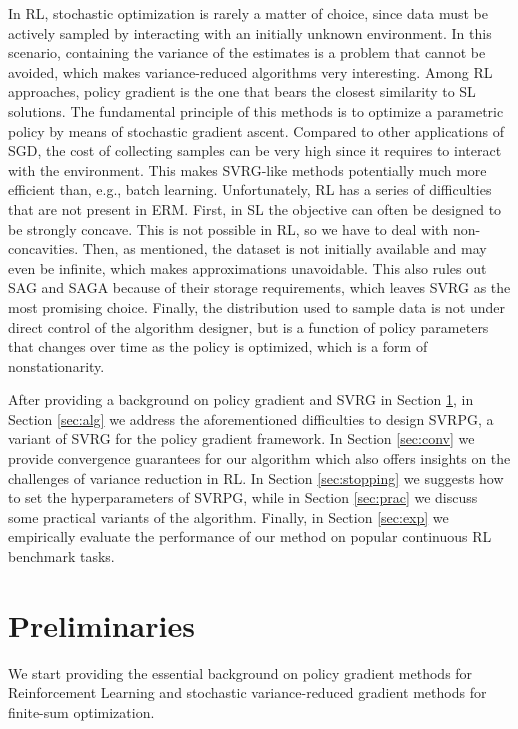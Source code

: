 \documentclass{article}
\makeatletter
\theoremstyle{remark}
\theoremstyle{definition}
\DeclareRobustCommand{\eg}{e.g.,\@\xspace}
\DeclareRobustCommand{\wrt}{w.r.t.\@\xspace}
\makeatother
\begin{document}
In RL, stochastic optimization is rarely a matter of choice, since data must be actively sampled by interacting with an initially unknown environment. In this scenario, containing the variance of the estimates is a problem that cannot be avoided, which makes variance-reduced algorithms very interesting.
Among RL approaches, policy gradient \cite{sutton2000policy} is the one that bears the closest similarity to SL solutions. The fundamental principle of this methods is to optimize a parametric policy by means of stochastic gradient ascent. Compared to other applications of SGD, the cost of collecting samples can be very high since it requires to interact with the environment. This makes SVRG-like methods potentially much more efficient than, \eg batch learning.
Unfortunately, RL has a series of difficulties that are not present in ERM. First, in SL the objective can often be designed to be strongly concave. This is not possible in RL, so we have to deal with non-concavities. Then, as mentioned, the dataset is not initially available and may even be infinite, which  makes approximations unavoidable. This also rules out SAG and SAGA because of their storage requirements, which leaves SVRG as the most promising choice. Finally, the distribution used to sample data is not under direct control of the algorithm designer, but is a function of policy parameters that changes over time as the policy is optimized, which is a form of nonstationarity.


After providing a background on policy gradient and SVRG in Section \ref{sec:pre}, in Section \ref{sec:alg} we address the aforementioned difficulties to design SVRPG, a variant of SVRG for the policy gradient framework. In Section \ref{sec:conv} we provide convergence guarantees for our algorithm which also offers insights on the challenges of variance reduction in RL. In Section \ref{sec:stopping} we suggests how to set the hyperparameters of SVRPG, while in Section \ref{sec:prac} we discuss some practical variants of the algorithm. Finally, in Section \ref{sec:exp} we empirically evaluate the performance of our method on popular continuous RL benchmark tasks.

\section{Preliminaries}\label{sec:pre}
We start providing the essential background on policy gradient methods for Reinforcement Learning and stochastic variance-reduced gradient methods for finite-sum optimization.
\end{document}
